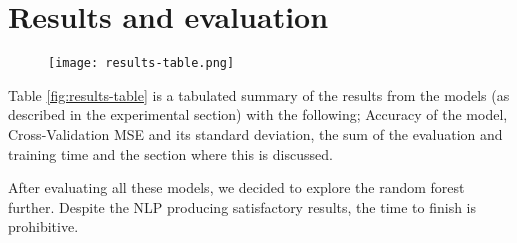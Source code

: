 \section{Results and evaluation}
\begin{figure}[h]
  \centering
  \texttt{[image: results-table.png]}
  \caption{}
  \label{fig:results-table}
\end{figure}

Table \autoref{fig:results-table} is a tabulated summary of the results from the models (as described in the experimental section) with the following; Accuracy of the model, Cross-Validation MSE and its standard deviation, the sum of the evaluation and training time and the section where this is discussed.

After evaluating all these models, we decided to explore the random forest further. Despite the NLP producing satisfactory results, the time to finish is prohibitive.
